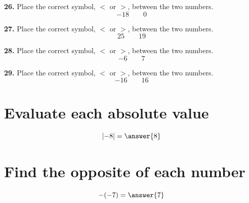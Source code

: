 \documentclass{ximera}
\begin{document}
\begin{problem}
\textbf{26.} Place the correct symbol, $<$ or $>$, between the two numbers.
\[
-18 \qquad 0
\]

\begin{multipleChoice}
\end{multipleChoice}
\end{problem}

\begin{problem}
\textbf{27.} Place the correct symbol, $<$ or $>$, between the two numbers.
\[
25 \qquad 19
\]

\begin{multipleChoice}
\end{multipleChoice}
\end{problem}

\begin{problem}
\textbf{28.} Place the correct symbol, $<$ or $>$, between the two numbers.
\[
-6 \qquad 7
\]

\begin{multipleChoice}
\end{multipleChoice}
\end{problem}



\begin{problem}
\textbf{29.} Place the correct symbol, $<$ or $>$, between the two numbers.
\[
-16 \qquad 16
\]

\begin{multipleChoice}
\end{multipleChoice}
\end{problem}

\section*{Evaluate each absolute value}

\begin{problem}
\[
\left| -8 \right| = \answer{8}
\]
\end{problem}

\section*{Find the opposite of each number}

\begin{problem}
\[
-(-7) = \answer{7}
\]
\end{problem}
\end{document}
